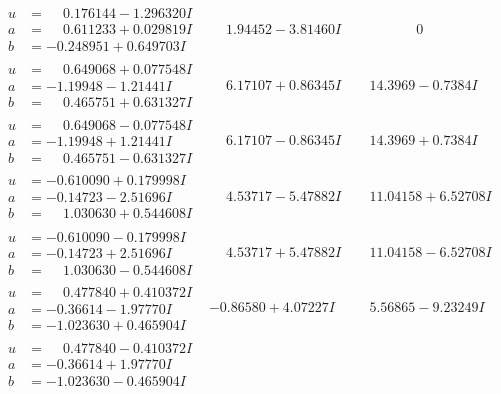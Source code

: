 \documentclass[1p]{elsarticle_modified}
\theoremstyle{definition}
\begin{document}
$$\begin{array}{c|c|c}
\begin{aligned}
u &= \phantom{-}0.176144 - 1.296320 I \\
a &= \phantom{-}0.611233 + 0.029819 I \\
b &= -0.248951 + 0.649703 I\end{aligned}
 & \phantom{-}1.94452 - 3.81460 I & \phantom{-0.000000 } 0 \\ \hline\begin{aligned}
u &= \phantom{-}0.649068 + 0.077548 I \\
a &= -1.19948 - 1.21441 I \\
b &= \phantom{-}0.465751 + 0.631327 I\end{aligned}
 & \phantom{-}6.17107 + 0.86345 I & \phantom{-}14.3969 - 0.7384 I \\ \hline\begin{aligned}
u &= \phantom{-}0.649068 - 0.077548 I \\
a &= -1.19948 + 1.21441 I \\
b &= \phantom{-}0.465751 - 0.631327 I\end{aligned}
 & \phantom{-}6.17107 - 0.86345 I & \phantom{-}14.3969 + 0.7384 I \\ \hline\begin{aligned}
u &= -0.610090 + 0.179998 I \\
a &= -0.14723 - 2.51696 I \\
b &= \phantom{-}1.030630 + 0.544608 I\end{aligned}
 & \phantom{-}4.53717 - 5.47882 I & \phantom{-}11.04158 + 6.52708 I \\ \hline\begin{aligned}
u &= -0.610090 - 0.179998 I \\
a &= -0.14723 + 2.51696 I \\
b &= \phantom{-}1.030630 - 0.544608 I\end{aligned}
 & \phantom{-}4.53717 + 5.47882 I & \phantom{-}11.04158 - 6.52708 I \\ \hline\begin{aligned}
u &= \phantom{-}0.477840 + 0.410372 I \\
a &= -0.36614 - 1.97770 I \\
b &= -1.023630 + 0.465904 I\end{aligned}
 & -0.86580 + 4.07227 I & \phantom{-}5.56865 - 9.23249 I \\ \hline\begin{aligned}
u &= \phantom{-}0.477840 - 0.410372 I \\
a &= -0.36614 + 1.97770 I \\
b &= -1.023630 - 0.465904 I\end{aligned}

\end{array}$$
\end{document}
